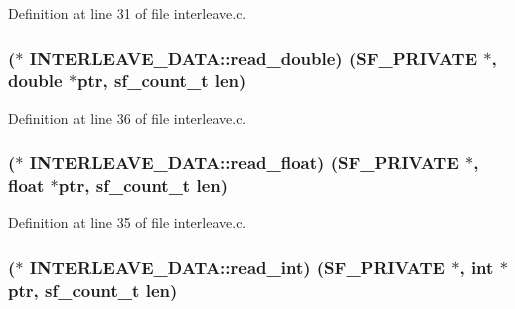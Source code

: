 Definition at line 31 of file interleave.\+c.

\subsubsection[{\texorpdfstring{read\+\_\+double}{read_double}}]{($\ast$ I\+N\+T\+E\+R\+L\+E\+A\+V\+E\+\_\+\+D\+A\+T\+A\+::read\+\_\+double) ({\bf S\+F\+\_\+\+P\+R\+I\+V\+A\+TE} $\ast$, double $\ast$ptr, {\bf sf\+\_\+count\+\_\+t} {\bf len})}\hypertarget{struct_i_n_t_e_r_l_e_a_v_e___d_a_t_a_a34754e9d2a32eeac3370db810ca9bcd4}{}\label{struct_i_n_t_e_r_l_e_a_v_e___d_a_t_a_a34754e9d2a32eeac3370db810ca9bcd4}


Definition at line 36 of file interleave.\+c.

\subsubsection[{\texorpdfstring{read\+\_\+float}{read_float}}]{($\ast$ I\+N\+T\+E\+R\+L\+E\+A\+V\+E\+\_\+\+D\+A\+T\+A\+::read\+\_\+float) ({\bf S\+F\+\_\+\+P\+R\+I\+V\+A\+TE} $\ast$, float $\ast$ptr, {\bf sf\+\_\+count\+\_\+t} {\bf len})}\hypertarget{struct_i_n_t_e_r_l_e_a_v_e___d_a_t_a_a7e7851184ca08d55664d25474dd467c6}{}\label{struct_i_n_t_e_r_l_e_a_v_e___d_a_t_a_a7e7851184ca08d55664d25474dd467c6}


Definition at line 35 of file interleave.\+c.

\subsubsection[{\texorpdfstring{read\+\_\+int}{read_int}}]{($\ast$ I\+N\+T\+E\+R\+L\+E\+A\+V\+E\+\_\+\+D\+A\+T\+A\+::read\+\_\+int) ({\bf S\+F\+\_\+\+P\+R\+I\+V\+A\+TE} $\ast$, {\bf int} $\ast$ptr, {\bf sf\+\_\+count\+\_\+t} {\bf len})}\hypertarget{struct_i_n_t_e_r_l_e_a_v_e___d_a_t_a_a6862fab891760b0f0a01e8c4aaea3ad6}{}\label{struct_i_n_t_e_r_l_e_a_v_e___d_a_t_a_a6862fab891760b0f0a01e8c4aaea3ad6}


